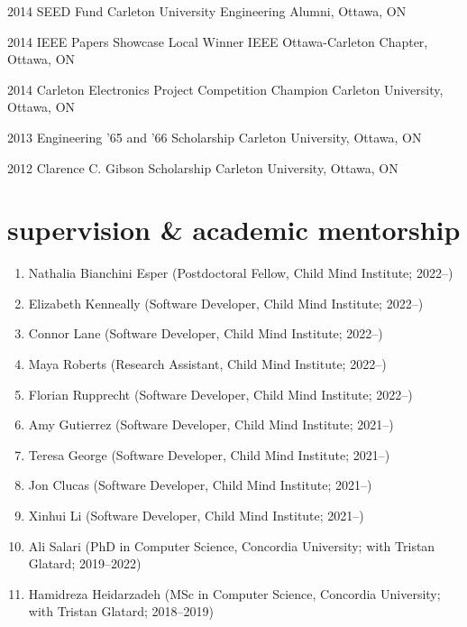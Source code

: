\documentclass[]{friggeri-cv} %
\begin{document}
\begin{entrylist}
\entry
{2014}
{SEED Fund}
{Carleton University Engineering Alumni, Ottawa, ON}
{}
\vspace{-7pt}

\entry
{2014}
{IEEE Papers Showcase Local Winner}
{IEEE Ottawa-Carleton Chapter, Ottawa, ON}
{}
\vspace{-7pt}

\entry
{2014}
{Carleton Electronics Project Competition Champion}
{Carleton University, Ottawa, ON}
{}
\vspace{-7pt}

\entry
{2013}
{Engineering '65 and '66 Scholarship}
{Carleton University, Ottawa, ON}
{}
\vspace{-7pt}

\entry
{2012}
{Clarence C. Gibson Scholarship}
{Carleton University, Ottawa, ON}
{}
\vspace{-7pt}
\end{entrylist}

\section{supervision \& academic mentorship}
\begin{enumerate}
\item Nathalia Bianchini Esper (Postdoctoral Fellow, Child Mind Institute; 2022–)
\item Elizabeth Kenneally (Software Developer, Child Mind Institute; 2022–)
\item Connor Lane (Software Developer, Child Mind Institute; 2022–)
\item Maya Roberts (Research Assistant, Child Mind Institute; 2022–)
\item Florian Rupprecht (Software Developer, Child Mind Institute; 2022–)
\item Amy Gutierrez (Software Developer, Child Mind Institute; 2021–)
\item Teresa George (Software Developer, Child Mind Institute; 2021–)
\item Jon Clucas (Software Developer, Child Mind Institute; 2021–)
\item Xinhui Li (Software Developer, Child Mind Institute; 2021–)
\item Ali Salari (PhD in Computer Science, Concordia University; with Tristan Glatard; 2019–2022)
\item Hamidreza Heidarzadeh (MSc in Computer Science, Concordia University; with Tristan Glatard; 2018–2019)
\end{enumerate}
\end{document}
